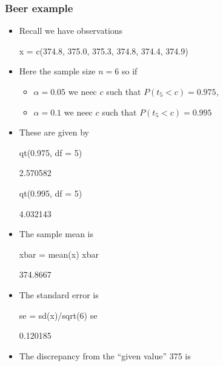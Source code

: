\documentclass[a4paper]{article}\usepackage[]{graphicx}\usepackage[]{xcolor}
\begin{document}
\subsubsection{Beer example}
\begin{itemize}
	\item Recall we have observations
\begin{Schunk}
\begin{Sinput}
x = c(374.8, 375.0, 375.3, 374.8, 374.4, 374.9)
\end{Sinput}
\end{Schunk}
	\item Here the sample size \( n = 6 \) so if
	\begin{itemize}
		\item \( \alpha = 0.05 \) we neec \( c \) such that \( P(t_5 < c) = 0.975 \),
		\item \( \alpha = 0.1 \) we neec \( c \) such that \( P(t_5 < c) = 0.995 \) 
	\end{itemize}
	\item These are given by
\begin{Schunk}
\begin{Sinput}
qt(0.975, df = 5)
\end{Sinput}
\begin{Soutput}
[1] 2.570582
\end{Soutput}
\begin{Sinput}
qt(0.995, df = 5)
\end{Sinput}
\begin{Soutput}
[1] 4.032143
\end{Soutput}
\end{Schunk}
	\item The sample mean is
\begin{Schunk}
\begin{Sinput}
xbar = mean(x)
xbar
\end{Sinput}
\begin{Soutput}
[1] 374.8667
\end{Soutput}
\end{Schunk}
	\item The standard error is
\begin{Schunk}
\begin{Sinput}
se = sd(x)/sqrt(6)
se
\end{Sinput}
\begin{Soutput}
[1] 0.120185
\end{Soutput}
\end{Schunk}
	\item The discrepancy from the ``given value'' 375 is

\end{itemize}
\end{document}
